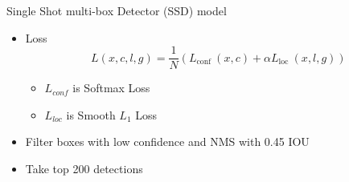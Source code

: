 \documentclass[10pt, aspectratio=169]{beamer}
\begin{document}
\begin{frame}[allowframebreaks]{Single Shot multi-box Detector (SSD) model}
\begin{multicols}{2}
        \begin{itemize}
            \item Loss
            $$L(x, c, l, g)=\frac{1}{N}\left(L_{\text {conf }}(x, c)+\alpha L_{\text {loc }}(x, l, g)\right)$$
            \begin{itemize}
                \item $L_{conf}$ is Softmax Loss
                \item $L_{loc}$ is Smooth $L_{1}$ Loss 
            \end{itemize}
            \item Filter boxes with low confidence and NMS with 0.45 IOU
            \item Take top 200 detections
            
        \end{itemize}
    \end{multicols}
\end{frame}
\end{document}
